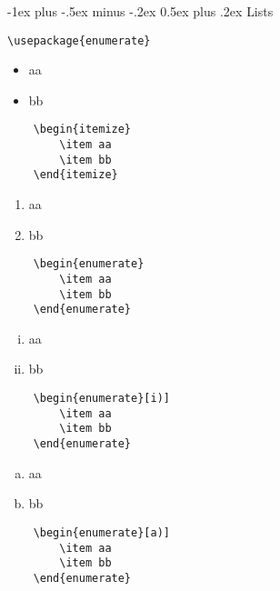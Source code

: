 \documentclass[a4paper,10pt,landscape]{article}
\makeatletter
\renewcommand{\section}{\@startsection{section}{1}{0mm}%
	                                {-1ex plus -.5ex minus -.2ex}%
	                                {0.5ex plus .2ex}%
	                                {\normalfont\large\bfseries}}
\theoremstyle{definition}
\theoremstyle{remark}
\makeatother
\begin{document}
\begin{multicols}{3}
\section{Lists}

\verb!\usepackage{enumerate}!
\begin{multicols}{2}
	\begin{itemize}
		\item aa
		\item bb
	\end{itemize}
\columnbreak
	\begin{verbatim}
	\begin{itemize}
		\item aa
		\item bb
	\end{itemize}
	\end{verbatim}
\end{multicols}
\begin{multicols}{2}
	\begin{enumerate}
		\item aa
		\item bb
	\end{enumerate}
\columnbreak
	\begin{verbatim}
	\begin{enumerate}
		\item aa
		\item bb
	\end{enumerate}
	\end{verbatim}
\end{multicols}
\begin{multicols}{2}
	\begin{enumerate}[i)]
		\item aa
		\item bb
	\end{enumerate}
\columnbreak
	\begin{verbatim}
	\begin{enumerate}[i)]
		\item aa
		\item bb
	\end{enumerate}
	\end{verbatim}
\end{multicols}
\begin{multicols}{2}
	\begin{enumerate}[a)]
		\item aa
		\item bb
	\end{enumerate}
\columnbreak
	\begin{verbatim}
	\begin{enumerate}[a)]
		\item aa
		\item bb
	\end{enumerate}
	\end{verbatim}
\end{multicols}





\end{multicols}
\end{document}
